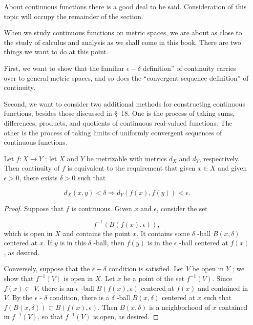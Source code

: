 About continuous functions there is a good deal to be said. Consideration of this topic will occupy the remainder of the section.

When we study continuous functions on metric spaces, we are about as close to the study of calculus and analysis as we shall come in this book. There are two things we want to do at this point.

First, we want to show that the familiar \(\epsilon - \delta\) definition'' of continuity carries over to general metric spaces, and so does the ``convergent sequence definition'' of continuity.

Second, we want to consider two additional methods for constructing continuous functions, besides those discussed in \S\ 18. One is the process of taking sums, differences, products, and quotients of continuous real-valued functions. The other is the process of taking limits of uniformly convergent sequences of continuous functions.

\begin{theorem}
\label{thm:\thetheorem}
 Let \(f : X \rightarrow Y\) ; let \(X\) and \(Y\) be metrizable with metrics \(d_{X}\) and \(d_{Y}\), respectively. Then continuity of \(f\) is equivalent to the requirement that given \(x \in X\) and given \(\epsilon > 0\), there exists \(\delta > 0\) such that

 \[
 d_{X}( {x,y}) < \delta \Rightarrow {d}_{Y}( {f(x),f( y) }) < \epsilon .
 \]

\end{theorem}

\begin{proof}
 Suppose that \(f\) is continuous. Given \(x\) and \(\epsilon\), consider the set

 \[
 f^{-1}( {B( {f(x),\epsilon }) }),
 \]
 which is open in \(X\) and contains the point \(x\). It contains some \(\delta\) -ball \(B( {x,\delta })\) centered at \(x\). If \(y\) is in this \(\delta\) -ball, then \(f( y)\) is in the \(\epsilon\) -ball centered at \(f(x)\), as desired.

 Conversely, suppose that the \(\epsilon - \delta\) condition is satisfied. Let \(V\) be open in \(Y\) ; we show that \(f^{-1}( V)\) is open in \(X\). Let \(x\) be a point of the set \(f^{-1}( V)\). Since \(f(x) \in\) \(V\), there is an \(\epsilon\) -ball \(B( {f(x),\epsilon })\) centered at \(f(x)\) and contained in \(V\). By the \(\epsilon\) - \(\delta\) condition, there is a \(\delta\) -ball \(B( {x,\delta })\) centered at \(x\) such that \(f( {B( {x,\delta }) }) \subset B( {f(x),\epsilon })\). Then \(B( {x,\delta })\) is a neighborhood of \(x\) contained in \(f^{-1}( V)\), so that \(f^{-1}( V)\) is open, as desired.
\end{proof}

